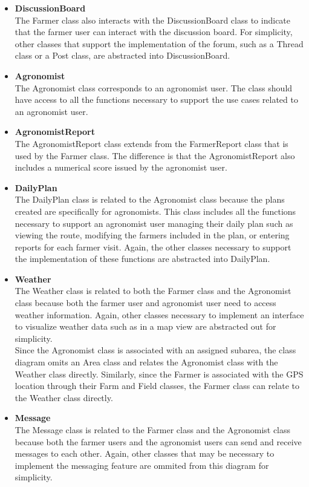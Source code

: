 \begin{flushleft}
\begin{itemize}
\item \textbf{DiscussionBoard}\\
The Farmer class also interacts with the DiscussionBoard class to indicate that the farmer user can interact with the discussion board. For simplicity, other classes that support the implementation of the forum, such as a Thread class or a Post class, are abstracted into DiscussionBoard. 

\item \textbf{Agronomist}\\
The Agronomist class corresponds to an agronomist user. The class should have access to all the functions necessary to support the use cases related to an agronomist user. 

\item \textbf{AgronomistReport}\\
The AgronomistReport class extends from the FarmerReport class that is used by the Farmer class. The difference is that the AgronomistReport also includes a numerical score issued by the agronomist user. 

\item \textbf{DailyPlan}\\
The DailyPlan class is related to the Agronomist class because the plans created are specifically for agronomists. This class includes all the functions necessary to support an agronomist user managing their daily plan such as viewing the route, modifying the farmers included in the plan, or entering reports for each farmer visit. Again, the other classes necessary to support the implementation of these functions are abstracted into DailyPlan.

\item \textbf{Weather}\\
The Weather class is related to both the Farmer class and the Agronomist class because both the farmer user and agronomist user need to access weather information. Again, other classes necessary to implement an interface to visualize weather data such as in a map view are abstracted out for simplicity.
\smallskip\\
Since the Agronomist class is associated with an assigned subarea, the class diagram omits an Area class and relates the Agronomist class with the Weather class directly. Similarly, since the Farmer is associated with the GPS location through their Farm and Field classes, the Farmer class can relate to the Weather class directly. 

\item \textbf{Message}\\
The Message class is related to the Farmer class and the Agronomist class because both the farmer users and the agronomist users can send and receive messages to each other. Again, other classes that may be necessary to implement the messaging feature are ommited from this diagram for simplicity.


\end{itemize}
\end{flushleft}
